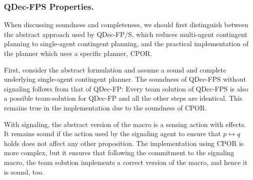 \documentclass[letterpaper]{article} %
\theoremstyle{definition}
\begin{document}

\subsubsection{QDec-FPS Properties.}
When discussing soundness and completeness, we should first
distinguish between the abstract approach used by QDec-FP/S, which reduces multi-agent contingent planning to single-agent contingent planning, and the practical implementation of the planner which uses a specific planner, CPOR.

First, consider the abstract formulation and assume a sound and complete underlying single-agent contingent planner. The soundness of QDec-FPS without signaling follows from that of QDec-FP: Every team solution of QDec-FPS is also a possible team-solution for QDec-FP and all the other steps are identical. This remains true in the implementation due to the soundness of CPOR.

With signaling, the abstract version of the macro is a sensing action with effects.
It remains sound if the action used by the signaling agent to ensure that $p\leftrightarrow q$ holds does not affect any other proposition. The implementation using CPOR is more complex, but it ensures that following the commitment to the signaling macro, the team solution implements a correct version of the macro, and hence it is sound, too.
\end{document}
